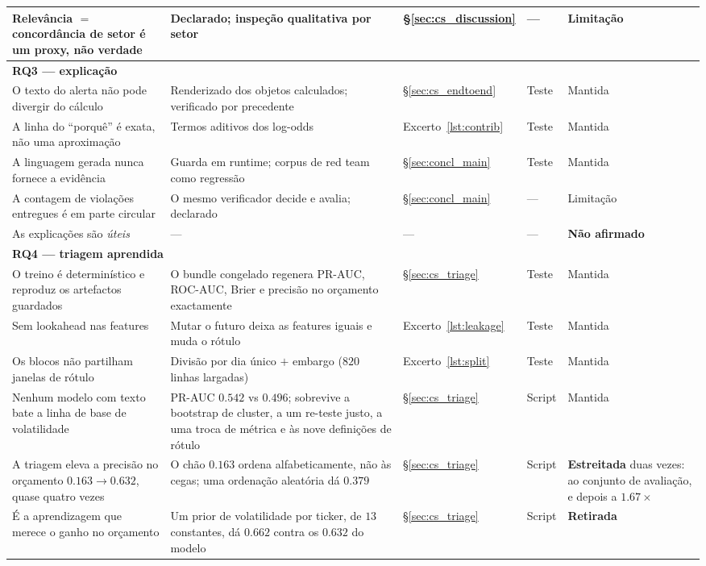 \begin{table}[ht]
\begin{tabular}{p{4.6cm} p{3.5cm} p{1.6cm} p{1.2cm} p{1.7cm}}
Relevância $=$ concordância de setor é um proxy, não verdade & Declarado; inspeção qualitativa por setor & §\ref{sec:cs_discussion} & --- & Limitação \\
\midrule
\multicolumn{5}{l}{\textbf{RQ3 — explicação}} \\
O texto do alerta não pode divergir do cálculo & Renderizado dos objetos calculados; verificado por precedente & §\ref{sec:cs_endtoend} & Teste & Mantida \\
A linha do ``porquê'' é exata, não uma aproximação & Termos aditivos dos log-odds & Excerto~\ref{lst:contrib} & Teste & Mantida \\
A linguagem gerada nunca fornece a evidência & Guarda em runtime; corpus de red team como regressão & §\ref{sec:concl_main} & Teste & Mantida \\
A contagem de violações entregues é em parte circular & O mesmo verificador decide e avalia; declarado & §\ref{sec:concl_main} & --- & Limitação \\
As explicações são \emph{úteis} & --- & --- & --- & \textbf{Não afirmado} \\
\midrule
\multicolumn{5}{l}{\textbf{RQ4 — triagem aprendida}} \\
O treino é determinístico e reproduz os artefactos guardados & O bundle congelado regenera PR-AUC, ROC-AUC, Brier e precisão no orçamento exactamente & §\ref{sec:cs_triage} & Teste & Mantida \\
Sem lookahead nas features & Mutar o futuro deixa as features iguais e muda o rótulo & Excerto~\ref{lst:leakage} & Teste & Mantida \\
Os blocos não partilham janelas de rótulo & Divisão por dia único $+$ embargo ($820$ linhas largadas) & Excerto~\ref{lst:split} & Teste & Mantida \\
Nenhum modelo com texto bate a linha de base de volatilidade & PR-AUC $0.542$ vs $0.496$; sobrevive a bootstrap de cluster, a um re-teste justo, a uma troca de métrica e às nove definições de rótulo & §\ref{sec:cs_triage} & Script & Mantida \\
A triagem eleva a precisão no orçamento $0.163 \to 0.632$, quase quatro vezes & O chão $0.163$ ordena alfabeticamente, não às cegas; uma ordenação aleatória dá $0.379$ & §\ref{sec:cs_triage} & Script & \textbf{Estreitada} duas vezes: ao conjunto de avaliação, e depois a $1.67\times$ \\
É a aprendizagem que merece o ganho no orçamento & Um prior de volatilidade por ticker, de $13$ constantes, dá $0.662$ contra os $0.632$ do modelo & §\ref{sec:cs_triage} & Script & \textbf{Retirada} \\

\end{tabular}
\end{table}
